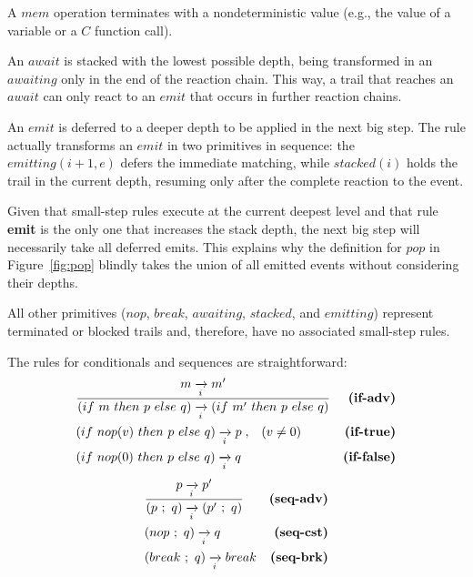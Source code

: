 A $mem$ operation terminates with a nondeterministic value (e.g., the value of 
a variable or a $C$ function call).

An $await$ is stacked with the lowest possible depth, being transformed in an 
$awaiting$ only in the end of the reaction chain.
This way, a trail that reaches an $await$ can only react to an $emit$ that 
occurs in further reaction chains.

An $emit$ is deferred to a deeper depth to be applied in the next big step.
The rule actually transforms an $emit$ in two primitives in sequence:
the $emitting(i+1,e)$ defers the immediate matching, while $stacked(i)$ holds 
the trail in the current depth, resuming only after the complete reaction to 
the event.

Given that small-step rules execute at the current deepest level and that rule 
\textbf{emit} is the only one that increases the stack depth, the next big step 
will necessarily take all deferred emits.
This explains why the definition for $pop$ in Figure~\ref{fig:pop} blindly 
takes the union of all emitted events without considering their depths.

All other primitives ($nop$, $break$, $awaiting$, $stacked$, and $emitting$) 
represent terminated or blocked trails and, therefore, have no associated 
small-step rules.

The rules for conditionals and sequences are straightforward:
%
\begin{eqnarray*}
& \frac
    { m \ST m' }
    { (if~m~then~p~else~q) \ST (if~m'~then~p~else~q) }
    & \textbf{(if-adv)}       \\
& (if~nop(v)~then~p~else~q) \ST p \1,\3 (v \neq 0)
    & \textbf{(if-true)}       \\
& (if~nop(0)~then~p~else~q) \ST q
    & \textbf{(if-false)}       %
\end{eqnarray*}
\begin{eqnarray*}
& \frac
    { p \ST p' }
    { (p~;~q) \ST (p'~;~q) }
    & \textbf{(seq-adv)}      \\
& (nop~;~q) \ST q
    & \textbf{(seq-cst)}      \\
& (break~;~q) \ST break
    & \textbf{(seq-brk)}     %
\end{eqnarray*}
%
%

